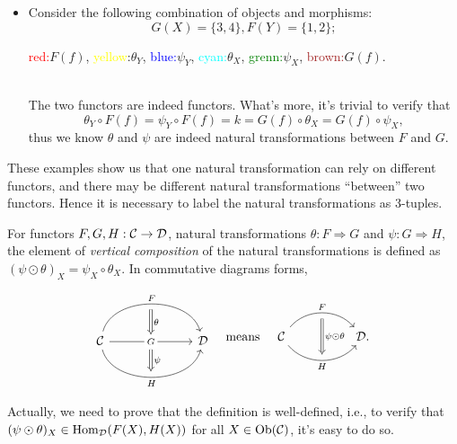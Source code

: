 \documentclass{article}
\begin{document}
\begin{exm}
\begin{itemize}
		\item Consider the following combination of objects and morphisms:
			\[G(X)=\{3,4\},F(Y)=\{1,2\};\]
			\centerline{\textcolor{red}{red:}$F(f)$, \textcolor{yellow}{yellow}:$\theta_Y$, \textcolor{blue}{blue:}$\psi_Y$, \textcolor{cyan}{cyan:}$\theta_X$, \textcolor{green}{grenn:}$\psi_X$, \textcolor{brown}{brown:}$G(f)$.}\\
		The two functors are indeed functors. What's more, it's trivial to verify that
		\[\theta_Y\circ F(f)=\psi_Y\circ F(f)=k=G(f)\circ\theta_X=G(f)\circ\psi_X,\]
		thus we know $\theta$ and $\psi$ are indeed natural transformations between $F$ and $G$.
	\end{itemize}
	These examples show us that one natural transformation can rely on different functors, and there may be different natural transformations ``between'' two functors. Hence it is necessary to label the natural transformations as 3-tuples.
\end{exm}


\begin{defi}\label{vertical composition}
	For functors $F,G,H:\mathcal{C}\to\mathcal{D}$, natural transformations $\theta:F\Rightarrow G$ and $\psi:G\Rightarrow H$, the element of \emph{vertical composition} of the natural transformations is defined as $(\psi\odot\theta)_X=\psi_X\circ\theta_X$. In commutative diagrams forms,
	
	\[\begin{tikzcd}	%
			& \arrow[d,Rightarrow,"\theta"] & \\
			\ca \arrow[rr, "F", bend left=75] \arrow[rr, "H"', bend right=75] \arrow[rr, "G" description] &
			\textcolor{white}{s} \arrow[d,Rightarrow,"\psi"] &
			\D\\ & \quad &
		\end{tikzcd}\quad\text{means}\quad\begin{tikzcd}
			\ca
			\arrow[bend left=50, rr, "F", ""' name=F]
			\arrow[bend right=50, rr, "H"', "" name=H] & & 
			\arrow[Rightarrow, from=F, to=H, "\psi\odot\theta"] \D.
	\end{tikzcd}\]
	
	Actually, we need to prove that the definition is well-defined, i.e., to verify that $(\psi\odot\theta)_X\in\mathrm{Hom}_{\mathcal{D}}(F(X),H(X))$ for all $X\in\mathrm{Ob}(\mathcal{C})$, it's easy to do so.
\end{defi}
\end{document}
